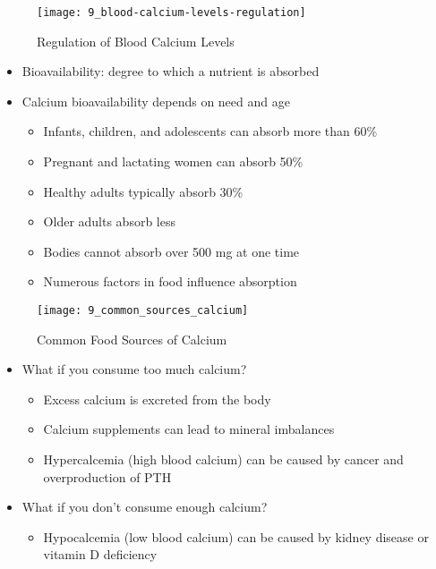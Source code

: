 \documentclass[title={Chapter 9}]{fdsn201notes}
\begin{document}
\begin{figure}[H]
	\centering
	\texttt{[image: 9\_blood-calcium-levels-regulation]}
	\caption{Regulation of Blood Calcium Levels}
	\label{fig:regulation-of-blood-calcium-levels}
\end{figure}

\begin{itemize}
	\item Bioavailability: degree to which a nutrient is absorbed
	\item Calcium bioavailability depends on need and age
	\begin{itemize}
		\item Infants, children, and adolescents can absorb more than 60\%
		\item Pregnant and lactating women can absorb 50\%
		\item Healthy adults typically absorb 30\%
		\item Older adults absorb less
		\item Bodies cannot absorb over 500 mg at one time
		\item Numerous factors in food influence absorption
	\end{itemize}
\end{itemize}

\begin{figure}[H]
	\centering
	\texttt{[image: 9\_common\_sources\_calcium]}
	\caption{Common Food Sources of Calcium}
	\label{fig:calcium-common-food-sources}
\end{figure}

\begin{itemize}
	\item What if you consume too much calcium?
	\begin{itemize}
		\item Excess calcium is excreted from the body
		\item Calcium supplements can lead to mineral imbalances
		\item Hypercalcemia (high blood calcium) can be caused by cancer and overproduction of PTH
	\end{itemize}
	\item What if you don’t consume enough calcium?
	\begin{itemize}
		\item Hypocalcemia (low blood calcium) can be caused by kidney disease or vitamin D deficiency
	\end{itemize}
\end{itemize}
\end{document}
